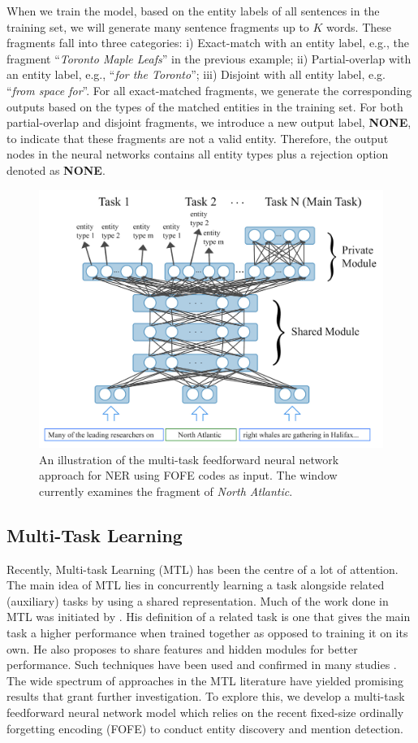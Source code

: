 \documentclass[11pt]{article}
\begin{document}
When we train the model, based on the entity labels of all sentences in the training set, we will generate many sentence fragments up to $K$ words. These fragments fall into three categories: i) Exact-match with an entity label, e.g., the fragment  ``{\it Toronto Maple Leafs}'' in the previous example; ii) Partial-overlap with an entity label, e.g., ``{\it for the Toronto}''; iii) Disjoint with all entity label, e.g. ``{\it from space for}''.
For all exact-matched fragments, we generate the corresponding outputs based on the types of the matched entities in the training set. For both partial-overlap and disjoint fragments, we introduce a new output label, {\bf NONE}, to indicate that these fragments are not a valid entity. Therefore, the output nodes in the neural networks contains all entity types plus a rejection option denoted as {\bf NONE}.

\begin{figure}[t]
\centering
\includegraphics[width=0.8\linewidth]{MTL-method.jpg}
\caption{An illustration of the multi-task feedforward neural network approach for NER using FOFE codes as input. The window currently examines the fragment of {\it North Atlantic}.}
\label{Fig:FOFE-MTL-NER-diagram}
\end{figure}

\subsection{Multi-Task Learning}

Recently, Multi-task Learning (MTL) has been the centre of a lot of attention. The main idea of MTL lies in concurrently learning a task alongside related (auxiliary) tasks by using a shared representation. Much of the work done in MTL was initiated by \cite{Caruana:1997:ML:262868.262872}. 
His definition of a related task is one that gives the main task a higher performance when trained together as opposed to training it on its own. He also proposes to share features and hidden modules for better performance. Such techniques have been used and confirmed in many studies \cite{Maurer:2016:BMR:2946645.3007034,Ando:2005:FLP:1046920.1194905}. The wide spectrum of approaches in the MTL literature have yielded promising results that grant further investigation. To explore this, we develop a multi-task feedforward neural network model which relies on the recent fixed-size ordinally forgetting encoding (FOFE) to conduct entity discovery and mention detection. 
\end{document}
